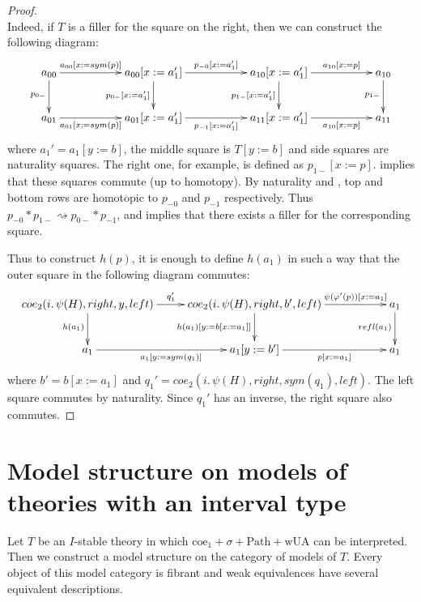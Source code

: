 \documentclass{mscs}
\newcommand{\repl}{:=}
\newcommand{\idtype}{\rightsquigarrow}
\newcommand{\wUA}{\mathrm{wUA}}
\newcommand{\coe}{\mathrm{coe}}
\newcommand{\Path}{\mathrm{Path}}
\numberwithin{figure}{section}
\begin{document}
\begin{proof}
\[{            } \]
Indeed, if $T$ is a filler for the square on the right, then we can construct the following diagram:
\[ \xymatrix{ a_{00} \ar[rr]^-{a_{00}[x \repl sym(p)]} \ar[d]_{p_{0-}} & & a_{00}[x \repl a_1'] \ar[rr]^{p_{-0}[x \repl a_1']} \ar[d]_{p_{0-}[x \repl a_1']} & & a_{10}[x \repl a_1'] \ar[d]_{p_{1-}[x \repl a_1']} \ar[rr]^-{a_{10}[x \repl p]} & & a_{10} \ar[d]_{p_{1-}} \\
              a_{01} \ar[rr]_-{a_{01}[x \repl sym(p)]}                 & & a_{01}[x \repl a_1'] \ar[rr]_{p_{-1}[x \repl a_1']}                               & & a_{11}[x \repl a_1']                               \ar[rr]_-{a_{10}[x \repl p]} & & a_{11}
            } \]
where $a_1' = a_1[y \repl b]$, the middle square is $T[y \repl b]$ and side squares are naturality squares.
The right one, for example, is defined as $p_{1-}[x \repl p]$.
 implies that these squares commute (up to homotopy).
By naturality and , top and bottom rows are homotopic to $p_{-0}$ and $p_{-1}$ respectively.
Thus $p_{-0} * p_{1-} \idtype p_{0-} * p_{-1}$, and  implies that there exists a filler for the corresponding square.

Thus to construct $h(p)$, it is enough to define $h(a_1)$ in such a way that the outer square in the following diagram commutes:
\[ \xymatrix{ coe_2(i.\,\psi(H), right, y, left) \ar[r]^{q_1'} \ar[d]_{h(a_1)} & coe_2(i.\,\psi(H), right, b', left) \ar[rr]^-{\psi(\varphi'(p))[x \repl a_1]} \ar[d]_{h(a_1)[y \repl b[x \repl a_1]]} & & a_1 \ar[d]_{refl(a_1)} \\
              a_1 \ar[r]_{a_1[y \repl sym(q_1)]} & a_1[y \repl b'] \ar[rr]_-{p[x \repl a_1]}                                                                                                                           & & a_1
            } \]
where $b' = b[x \repl a_1]$ and $q_1' = coe_2(i.\,\psi(H), right, sym(q_1), left)$.
The left square commutes by naturality.
Since $q_1'$ has an inverse, the right square also commutes.
\end{proof}

\section{Model structure on models of theories with an interval type}
\label{sec:model-structure}

Let $T$ be an $I$-stable theory in which $\coe_1 + \sigma + \Path + \wUA$ can be interpreted.
Then we construct a model structure on the category of models of $T$.
Every object of this model category is fibrant and weak equivalences have several equivalent descriptions.
\end{document}
